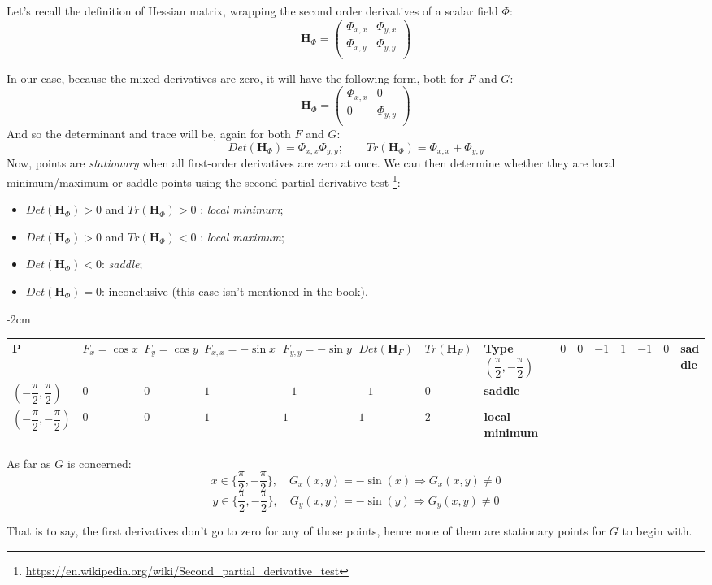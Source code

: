 \documentclass[solutions.tex]{subfiles}
\begin{document}
Let's recall the definition of Hessian matrix, wrapping the second
order derivatives of a scalar field $\Phi$:
\[
	\bm{H}_\Phi = \begin{pmatrix}
		\Phi_{x,x} & \Phi_{y,x} \\
		\Phi_{x,y} & \Phi_{y,y} \\
	\end{pmatrix}
\]

In our case, because the mixed derivatives are zero, it will
have the following form, both for $F$ and $G$:
\[
	\bm{H}_\Phi = \begin{pmatrix}
		\Phi_{x,x} & 0 \\
		0& \Phi_{y,y} \\
	\end{pmatrix}
\]
And so the determinant and trace will be, again for both $F$ and $G$:
\[
	Det(\bm{H}_\Phi) = \Phi_{x,x}\Phi_{y,y};\quad\quad
		Tr(\bm{H}_\Phi) = \Phi_{x,x}+\Phi_{y,y}
\]
Now, points are \textit{stationary} when all first-order derivatives
are zero at once. We can then determine whether they are local
minimum/maximum or saddle points using the second partial derivative test
\footnote{\url{https://en.wikipedia.org/wiki/Second\_partial\_derivative\_test}}:
\begin{itemize}
	\item $Det(\bm{H}_\Phi) > 0$ and $Tr(\bm{H}_\Phi) > 0$ : \textit{local minimum};
	\item $Det(\bm{H}_\Phi) > 0$ and $Tr(\bm{H}_\Phi) < 0$ : \textit{local maximum};
	\item $Det(\bm{H}_\Phi) < 0$: \textit{saddle};
	\item $Det(\bm{H}_\Phi) = 0$: inconclusive (this case isn't mentioned in the book).
\end{itemize}

\begingroup
	\renewcommand\arraystretch{1.5}
	\setlength\LTleft{-0.45in}
	\centering
    \addtolength{\leftskip} {-2cm} %
	\begin{longtable}{|@{} C{.1\textwidth} *{4}{C{.135\textwidth}} *{2}{C{.1\textwidth}} C{.13\textwidth} @{}|}
	\hline
	\textbf{P} & \textbf{$F_x=\cos x$} & \textbf{$F_y=\cos y$} & \textbf{$F_{x,x} = -\sin x$} & \textbf{$F_{y,y} = -\sin y$} &
		\textbf{$Det(\bm{H}_F)$} & \textbf{$Tr(\bm{H}_F)$} & \textbf{Type} \endhead \hline
		$(\dfrac\pi2,-\dfrac\pi2)$ & 0 & 0 & $-1$ & $1$ & $-1$ & $0$ & \textbf{saddle} \\
		$(-\dfrac\pi2,\dfrac\pi2)$ & 0 & 0 & $1$ & $-1$ & $-1$ & $0$ & \textbf{saddle} \\
		$(-\dfrac\pi2,-\dfrac\pi2)$ & 0 & 0 & $1$ & $1$ & $1$ & $2$ & \textbf{local minimum} \\
	\hline
	\end{longtable}
\endgroup

As far as $G$ is concerned:
\[
	x \in \{ \frac\pi2, -\frac\pi2\},\quad G_x(x,y) = -\sin(x) \Rightarrow G_x(x,y) \ne 0
\]
\[
	y \in \{ \frac\pi2, -\frac\pi2\},\quad G_y(x,y) = -\sin(y) \Rightarrow G_y(x,y) \ne 0
\]

That is to say, the first derivatives don't go to zero for any of those
points, hence none of them are stationary points for $G$ to begin with.
\end{document}
